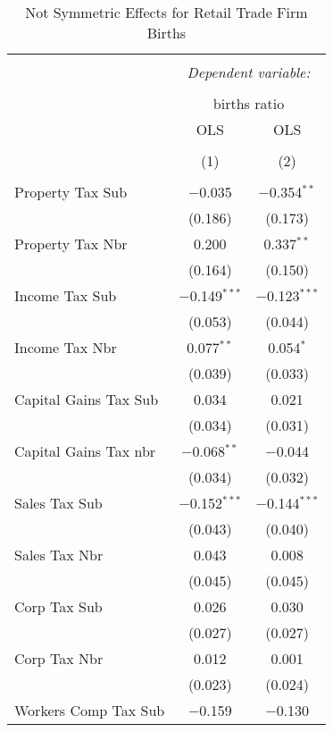 
\begin{table}[!htbp] \centering 
  \caption{Not Symmetric Effects for  Retail Trade Firm Births} 
  \label{44-45noequality} 
\footnotesize 
\begin{tabular}{@{\extracolsep{5pt}}lcc} 
\\[-1.8ex]\hline 
\hline \\[-1.8ex] 
 & \multicolumn{2}{c}{\textit{Dependent variable:}} \\ 
\cline{2-3} 
\\[-1.8ex] & \multicolumn{2}{c}{births ratio} \\ 
 & OLS & OLS \\ 
\\[-1.8ex] & (1) & (2)\\ 
\hline \\[-1.8ex] 
 Property Tax Sub & $-$0.035 & $-$0.354$^{**}$ \\ 
  & (0.186) & (0.173) \\ 
  Property Tax Nbr & 0.200 & 0.337$^{**}$ \\ 
  & (0.164) & (0.150) \\ 
  Income Tax Sub & $-$0.149$^{***}$ & $-$0.123$^{***}$ \\ 
  & (0.053) & (0.044) \\ 
  Income Tax Nbr & 0.077$^{**}$ & 0.054$^{*}$ \\ 
  & (0.039) & (0.033) \\ 
  Capital Gains Tax Sub & 0.034 & 0.021 \\ 
  & (0.034) & (0.031) \\ 
  Capital Gains Tax nbr & $-$0.068$^{**}$ & $-$0.044 \\ 
  & (0.034) & (0.032) \\ 
  Sales Tax Sub & $-$0.152$^{***}$ & $-$0.144$^{***}$ \\ 
  & (0.043) & (0.040) \\ 
  Sales Tax Nbr & 0.043 & 0.008 \\ 
  & (0.045) & (0.045) \\ 
  Corp Tax Sub & 0.026 & 0.030 \\ 
  & (0.027) & (0.027) \\ 
  Corp Tax Nbr & 0.012 & 0.001 \\ 
  & (0.023) & (0.024) \\ 
  Workers Comp Tax Sub & $-$0.159 & $-$0.130 \\ 

\end{tabular}
\end{table}

